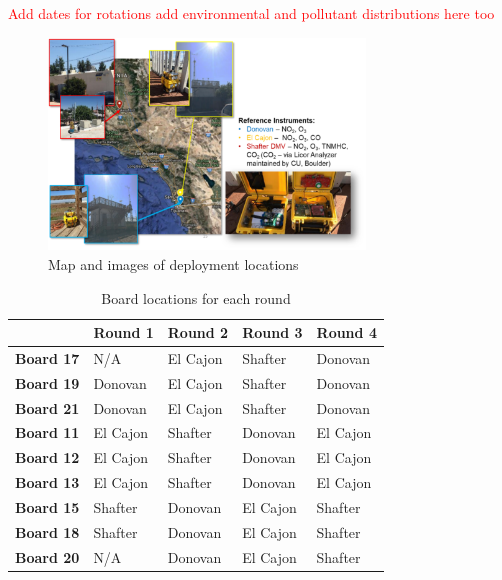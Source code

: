 \documentclass[journal abbreviation, manuscript]{copernicus}
\newcommand\todo[1]{\textcolor{red}{#1}}
\begin{document}
\todo{Add dates for rotations}
\todo  {add environmental and pollutant distributions here too}

\begin{figure}[H]
\centering
\includegraphics[width=0.75\textwidth]{writeup/img/MSdeployment.png}
\caption{Map and images of deployment locations}
\label{fig:img-label}
\end{figure}


\begin{table}[H]
\centering
\caption{Board locations for each round}
\begin{tabular}{l|llll}
                  & \textbf{Round 1} & \textbf{Round 2} & \textbf{Round 3} & \textbf{Round 4} \\ \hline
\textbf{Board 17} & N/A & El Cajon  & Shafter     &Donovan    \\
\textbf{Board 19} & Donovan & El Cajon       & Shafter       &Donovan   \\
\textbf{Board 21} & Donovan          & El Cajon         & Shafter        &Donovan  \\ \hline
\textbf{Board 11} & El Cajon         & Shafter          & Donovan        &El Cajon  \\
\textbf{Board 12} & El Cajon         & Shafter          & Donovan        &El Cajon  \\
\textbf{Board 13} & El Cajon         & Shafter          & Donovan         &El Cajon  \\ \hline
\textbf{Board 15} & Shafter          & Donovan          & El Cajon     &Shafter    \\
\textbf{Board 18} & Shafter          & Donovan          & El Cajon    &Shafter     \\
\textbf{Board 20} & N/A & Donovan          & El Cajon    &Shafter   
\end{tabular}
\label{tab:board-rotations}
\end{table}
\end{document}
